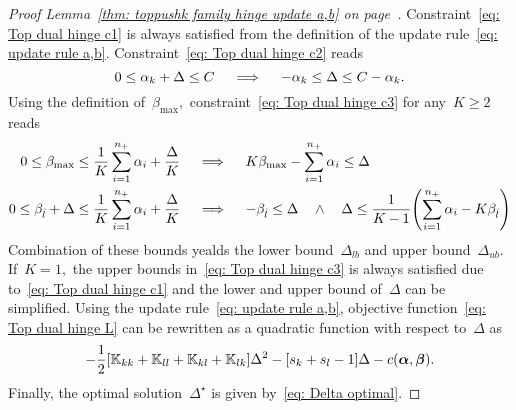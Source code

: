 \topruleab*
\begin{proof}[Proof Lemma~\ref{thm: toppushk family hinge update a,b} on page~\pageref{thm: toppushk family hinge update a,b}]
  Constraint~\eqref{eq: Top dual hinge c1} is always satisfied from the definition of the update rule~\eqref{eq: update rule a,b}. Constraint~\eqref{eq: Top dual hinge c2} reads
  \begin{equation*}
    0 \leq \alpha_k + \Delta \leq C
    \quad \implies \quad
    - \alpha_k \leq \Delta \leq C - \alpha_k.
  \end{equation*}
  Using the definition of~$\beta_{\max},$ constraint~\eqref{eq: Top dual hinge c3} for any~$K \geq 2$ reads
  \begin{align*}
    0 \leq \beta_{\max} \leq \frac{1}{K} \sum_{i = 1}^{\npos} \alpha_i + \frac{\Delta}{K} 
    & \quad \implies \quad
    K\beta_{\max} - \sum_{i = 1}^{\npos} \alpha_i \leq \Delta \\
    0 \leq \betal + \Delta \leq \frac{1}{K} \sum_{i = 1}^{\npos} \alpha_i + \frac{\Delta}{K}
    & \quad \implies \quad
    -\betal \leq \Delta \quad \land \quad \Delta \leq \frac{1}{K-1}\Brac{\sum_{i = 1}^{\npos} \alpha_i - K \betal}
  \end{align*}
  Combination of these bounds yealds the lower bound~$\Delta_{lb}$ and upper bound~$\Delta_{ub}.$ If~$K = 1,$ the upper bounds in~\eqref{eq: Top dual hinge c3} is always satisfied due to~\eqref{eq: Top dual hinge c1} and the lower and upper bound of~$\Delta$ can be simplified. Using the update rule~\eqref{eq: update rule a,b}, objective function~\eqref{eq: Top dual hinge L} can be rewritten as a quadratic function with respect to~$\Delta$ as
  \begin{equation*}
    - \frac{1}{2} \Brac[s]{\K_{kk} + \K_{ll} + \K_{kl} + \K_{lk}} \Delta^2
    - \Brac[s]{s_k + s_l - 1} \Delta
    - c(\bm{\alpha}, \bm{\beta}).
  \end{equation*}
  Finally, the optimal solution~$\Delta^{\star}$ is given by~\eqref{eq: Delta optimal}.
\end{proof}

